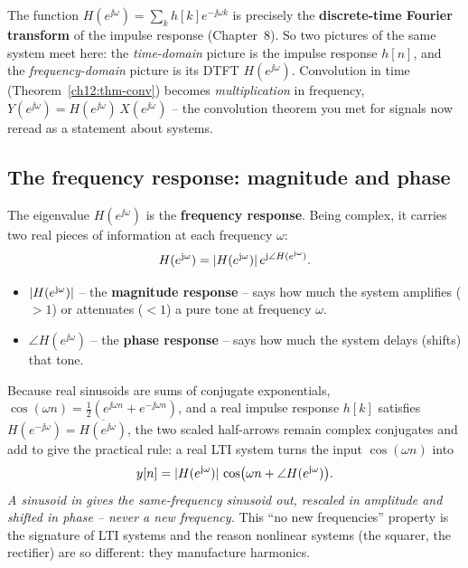 \begin{connectionbox}
The function $H(e^{\jj\omega})=\sum_k h[k]e^{-\jj\omega k}$ is precisely the
\textbf{discrete-time Fourier transform} of the impulse response (Chapter~8). So
two pictures of the same system meet here: the \emph{time-domain} picture is the
impulse response $h[n]$, and the \emph{frequency-domain} picture is its DTFT
$H(e^{\jj\omega})$. Convolution in time (Theorem~\ref{ch12:thm-conv}) becomes
\emph{multiplication} in frequency, $Y(e^{\jj\omega})=H(e^{\jj\omega})\,
X(e^{\jj\omega})$ -- the convolution theorem you met for signals now reread as a
statement about systems.
\end{connectionbox}

\subsection*{The frequency response: magnitude and phase}

The eigenvalue $H(e^{\jj\omega})$ is the \textbf{frequency response}. Being
complex, it carries two real pieces of information at each frequency $\omega$:
\[
  H(e^{\mathrm{j}\omega}) = \lvert H(e^{\mathrm{j}\omega})\rvert\,e^{\mathrm{j}\angle H(e^{\mathrm{j}\omega})}.
\]
\begin{itemize}
  \item $\lvert H(e^{\mathrm{j}\omega})\rvert$ -- the \textbf{magnitude response} -- says how
        much the system amplifies ($>1$) or attenuates ($<1$) a pure tone at
        frequency $\omega$.
  \item $\angle H(e^{\jj\omega})$ -- the \textbf{phase response} -- says how much
        the system delays (shifts) that tone.
\end{itemize}
Because real sinusoids are sums of conjugate exponentials,
$\cos(\omega n)=\tfrac12(e^{\jj\omega n}+e^{-\jj\omega n})$, and a real impulse response $h[k]$ satisfies $H(e^{-\jj\omega}) = \overline{H(e^{\jj\omega})}$, the two scaled half-arrows remain complex conjugates and add to give the practical rule: a real LTI system turns the input
$\cos(\omega n)$ into
\[
  y[n] = \lvert H(e^{\mathrm{j}\omega})\rvert\,\cos\!\big(\omega n + \angle H(e^{\mathrm{j}\omega})\big).
\]
\emph{A sinusoid in gives the same-frequency sinusoid out, rescaled in amplitude
and shifted in phase -- never a new frequency.} This ``no new frequencies''
property is the signature of LTI systems and the reason nonlinear systems (the
squarer, the rectifier) are so different: they manufacture harmonics.

